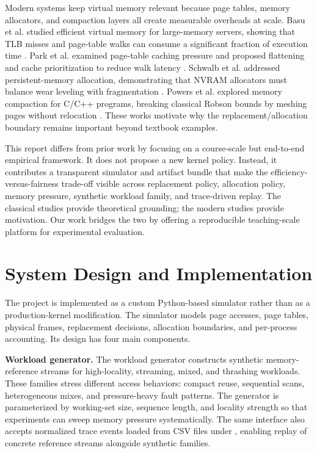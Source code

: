 \documentclass[conference]{IEEEtran}
\newcommand{\file}[1]{\path{#1}}
\begin{document}
Modern systems keep virtual memory relevant because page tables, memory allocators, and compaction layers all create measurable overheads at scale. Basu et al. studied efficient virtual memory for large-memory servers, showing that TLB misses and page-table walks can consume a significant fraction of execution time \cite{Basu2013}. Park et al. examined page-table caching pressure and proposed flattening and cache prioritization to reduce walk latency \cite{Park2022}. Schwalb et al. addressed persistent-memory allocation, demonstrating that NVRAM allocators must balance wear leveling with fragmentation \cite{Schwalb2015}. Powers et al. explored memory compaction for C/C++ programs, breaking classical Robson bounds by meshing pages without relocation \cite{Powers2019}. These works motivate why the replacement/allocation boundary remains important beyond textbook examples.

This report differs from prior work by focusing on a course-scale but end-to-end empirical framework. It does not propose a new kernel policy. Instead, it contributes a transparent simulator and artifact bundle that make the efficiency-versus-fairness trade-off visible across replacement policy, allocation policy, memory pressure, synthetic workload family, and trace-driven replay. The classical studies provide theoretical grounding; the modern studies provide motivation. Our work bridges the two by offering a reproducible teaching-scale platform for experimental evaluation.

\section{System Design and Implementation}
The project is implemented as a custom Python-based simulator rather than as a production-kernel modification. The simulator models page accesses, page tables, physical frames, replacement decisions, allocation boundaries, and per-process accounting. Its design has four main components.

\textbf{Workload generator.} The workload generator constructs synthetic memory-reference streams for high-locality, streaming, mixed, and thrashing workloads. These families stress different access behaviors: compact reuse, sequential scans, heterogeneous mixes, and pressure-heavy fault patterns. The generator is parameterized by working-set size, sequence length, and locality strength so that experiments can sweep memory pressure systematically. The same interface also accepts normalized trace events loaded from CSV files under \file{workloads/traces/}, enabling replay of concrete reference streams alongside synthetic families.
\end{document}
